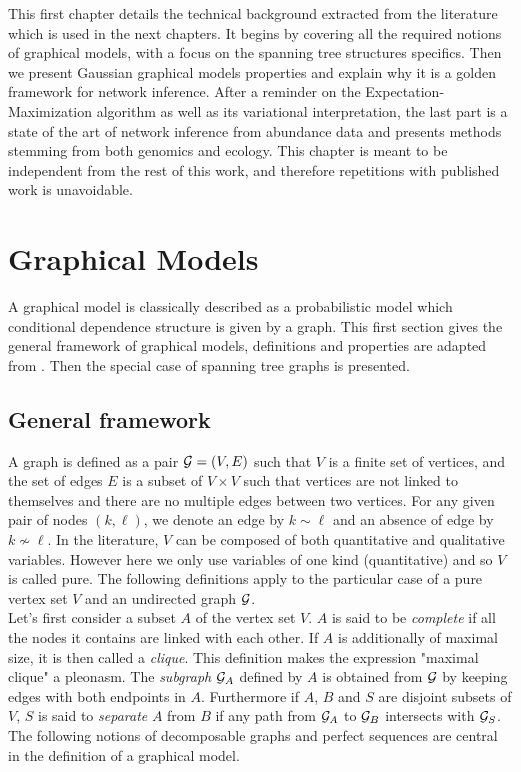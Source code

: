 
\vspace{1cm}
This first chapter  details the technical background extracted from the literature which is used in the next chapters. It begins by covering all the required notions of graphical models, with a  focus on the spanning tree structures specifics. Then we present Gaussian graphical models properties and explain why it is a golden framework for network inference. After a reminder on the Expectation-Maximization algorithm as well as its variational interpretation, the last part is a state of the art of network inference from abundance data and presents methods stemming from both genomics and ecology. This chapter is meant to be independent from the rest of this work, and therefore repetitions with published work is unavoidable.


 \section{Graphical Models}
 A graphical model is classically described as a probabilistic model which conditional dependence structure is given by a graph. This first section gives the general framework of graphical models, definitions and properties are adapted from \citet{Lau96}.  Then the special case of  spanning tree graphs is presented.
 \subsection{General framework}
 A graph is defined as a pair $\mathcal{G}=(V,E)$ such that $V$ is a finite set of vertices, and the set of edges $E$ is a subset of $V\times V$ such that vertices are not linked to themselves and there are no multiple edges between two vertices. For any given pair of nodes $(k,\ell)$, we denote an edge by $k\sim\ell$ and an absence of edge by $k\nsim \ell$. In the literature, $V$ can be composed of both quantitative and qualitative variables. However here we  only use variables of one kind (quantitative) and so $V$ is called pure. The following definitions apply to the particular case of a pure vertex set $V$ and an undirected graph $\mathcal{G}$.\\

Let's first consider a subset $A$ of the vertex set $V$. $A$ is said to be \textit{complete} if all the nodes it contains are linked with each other. If $A$ is additionally of maximal size, it is then called a \textit{clique}. This definition makes the expression "maximal clique" a pleonasm. The \textit{subgraph} $\mathcal{G}_A$ defined by $A$  is obtained from $\mathcal{G}$ by keeping edges with both endpoints in $A$. Furthermore if $A$, $B$ and $S$ are disjoint subsets of $V$, $S$ is said to \textit{separate} $A$ from $B$ if any path from $\mathcal{G}_A$ to $\mathcal{G}_B$ intersects with $\mathcal{G}_S$. The following notions of decomposable graphs and perfect sequences are central in the definition of a graphical model.
 
